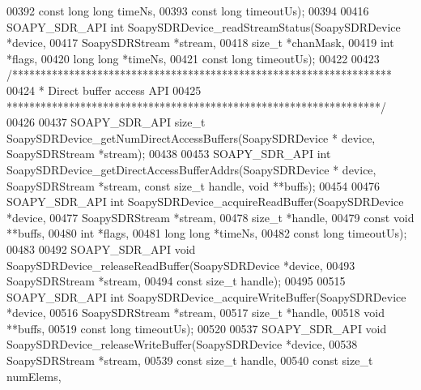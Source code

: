 \begin{DoxyCode}
00392     \textcolor{keyword}{const} \textcolor{keywordtype}{long} \textcolor{keywordtype}{long} timeNs,
00393     \textcolor{keyword}{const} \textcolor{keywordtype}{long} timeoutUs);
00394 
00416 SOAPY_SDR_API \textcolor{keywordtype}{int} SoapySDRDevice_readStreamStatus(SoapySDRDevice *device,
00417     SoapySDRStream *stream,
00418     \textcolor{keywordtype}{size\_t} *chanMask,
00419     \textcolor{keywordtype}{int} *flags,
00420     \textcolor{keywordtype}{long} \textcolor{keywordtype}{long} *timeNs,
00421     \textcolor{keyword}{const} \textcolor{keywordtype}{long} timeoutUs);
00422 
00423 \textcolor{comment}{/*******************************************************************}
00424 \textcolor{comment}{ * Direct buffer access API}
00425 \textcolor{comment}{ ******************************************************************/}
00426 
00437 SOAPY_SDR_API \textcolor{keywordtype}{size\_t} SoapySDRDevice_getNumDirectAccessBuffers(SoapySDRDevice *
      device, SoapySDRStream *stream);
00438 
00453 SOAPY_SDR_API \textcolor{keywordtype}{int} SoapySDRDevice_getDirectAccessBufferAddrs(SoapySDRDevice *
      device, SoapySDRStream *stream, \textcolor{keyword}{const} \textcolor{keywordtype}{size\_t} handle, \textcolor{keywordtype}{void} **buffs);
00454 
00476 SOAPY_SDR_API \textcolor{keywordtype}{int} SoapySDRDevice_acquireReadBuffer(SoapySDRDevice *device,
00477     SoapySDRStream *stream,
00478     \textcolor{keywordtype}{size\_t} *handle,
00479     \textcolor{keyword}{const} \textcolor{keywordtype}{void} **buffs,
00480     \textcolor{keywordtype}{int} *flags,
00481     \textcolor{keywordtype}{long} \textcolor{keywordtype}{long} *timeNs,
00482     \textcolor{keyword}{const} \textcolor{keywordtype}{long} timeoutUs);
00483 
00492 SOAPY_SDR_API \textcolor{keywordtype}{void} SoapySDRDevice_releaseReadBuffer(SoapySDRDevice *device,
00493     SoapySDRStream *stream,
00494     \textcolor{keyword}{const} \textcolor{keywordtype}{size\_t} handle);
00495 
00515 SOAPY_SDR_API \textcolor{keywordtype}{int} SoapySDRDevice_acquireWriteBuffer(SoapySDRDevice *device,
00516     SoapySDRStream *stream,
00517     \textcolor{keywordtype}{size\_t} *handle,
00518     \textcolor{keywordtype}{void} **buffs,
00519     \textcolor{keyword}{const} \textcolor{keywordtype}{long} timeoutUs);
00520 
00537 SOAPY_SDR_API \textcolor{keywordtype}{void} SoapySDRDevice_releaseWriteBuffer(SoapySDRDevice *device,
00538     SoapySDRStream *stream,
00539     \textcolor{keyword}{const} \textcolor{keywordtype}{size\_t} handle,
00540     \textcolor{keyword}{const} \textcolor{keywordtype}{size\_t} numElems,

\end{DoxyCode}
